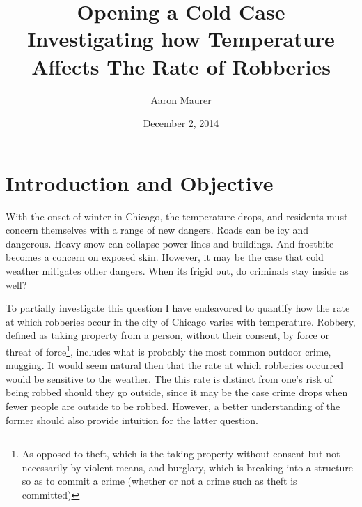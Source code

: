 \documentclass[11pt]{article}
\title{Opening a Cold Case \\ {\large Investigating how Temperature Affects The Rate of Robberies}}
\date{December 2, 2014}
\author{Aaron Maurer}
\theoremstyle{definition}
\begin{document}
\maketitle

\section{Introduction and Objective} 

With the onset of winter in Chicago, the temperature drops, and residents must concern themselves with a range of new dangers. Roads can be icy and dangerous. Heavy snow can collapse power lines and buildings. And frostbite becomes a concern on exposed skin. However, it may be the case that cold weather mitigates other dangers. When its frigid out, do criminals stay inside as well? \par

To partially investigate this question I have endeavored to quantify how the rate at which robberies occur in the city of Chicago varies with temperature. Robbery, defined as taking property from a person, without their consent, by force or threat of force\footnote{As opposed to theft, which is the taking property without consent but not necessarily by violent means, and burglary, which is breaking into a structure so as to commit a crime (whether or not a crime such as theft is committed)}, includes what is probably the most common outdoor crime, mugging. It would seem natural then that the rate at which robberies occurred would be sensitive to the weather. The this rate is distinct from one's risk of being robbed should they go outside, since it may be the case crime drops when fewer people are outside to be robbed. However, a better understanding of the former should also provide intuition for the latter question.
\par
\end{document}
